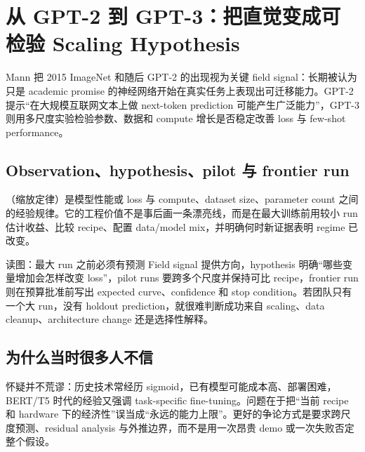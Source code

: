 \section{从 GPT-2 到 GPT-3：把直觉变成可检验 Scaling Hypothesis}

Mann 把 2015 ImageNet 和随后 GPT-2 的出现视为关键 field signal：长期被认为只是 academic promise 的神经网络开始在真实任务上表现出可迁移能力。GPT-2 提示“在大规模互联网文本上做 next-token prediction 可能产生广泛能力”，GPT-3 则用多尺度实验检验参数、数据和 compute 增长是否稳定改善 loss 与 few-shot performance。

\subsection{Observation、hypothesis、pilot 与 frontier run}

（缩放定律）是模型性能或 loss 与 compute、dataset size、parameter count 之间的经验规律。它的工程价值不是事后画一条漂亮线，而是在最大训练前用较小 run 估计收益、比较 recipe、配置 data/model mix，并明确何时新证据表明 regime 已改变。


\begin{knowledgebox}{读图：最大 run 之前必须有预测}
Field signal 提供方向，hypothesis 明确“哪些变量增加会怎样改变 loss”，pilot runs 要跨多个尺度并保持可比 recipe，frontier run 则在预算批准前写出 expected curve、confidence 和 stop condition。若团队只有一个大 run，没有 holdout prediction，就很难判断成功来自 scaling、data cleanup、architecture change 还是选择性解释。
\end{knowledgebox}


\subsection{为什么当时很多人不信}

怀疑并不荒谬：历史技术常经历 sigmoid，已有模型可能成本高、部署困难，BERT/T5 时代的经验又强调 task-specific fine-tuning。问题在于把“当前 recipe 和 hardware 下的经济性”误当成“永远的能力上限”。更好的争论方式是要求跨尺度预测、residual analysis 与外推边界，而不是用一次昂贵 demo 或一次失败否定整个假设。

